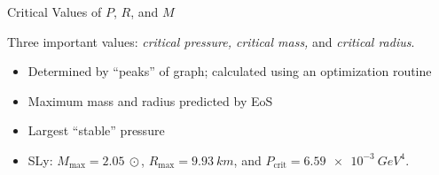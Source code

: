 \documentclass[]{beamer}
\begin{document}
\begin{frame}{Critical Values of $P$, $R$, and $M$}
\begin{figure}[h!]
\begin{subfigure}{.5\textwidth}
            \end{subfigure}
        \end{figure} \pause
        Three important values: \pause \textit{critical pressure, critical mass,} and \textit{critical radius}. \pause 
        \begin{itemize}
            \item Determined by ``peaks'' of graph\pause ; calculated using an optimization routine \pause
            \item Maximum mass and radius predicted by EoS \pause
            \item Largest ``stable'' pressure \pause
            \item SLy: $M_\text{max} = \SI{2.05}{\odot}$, $R_\text{max} = \SI{9.93}{km}$, and $P_\text{crit} = \SI{6.59e-3}{GeV^4}$.
        \end{itemize}

    \end{frame}
\end{document}
